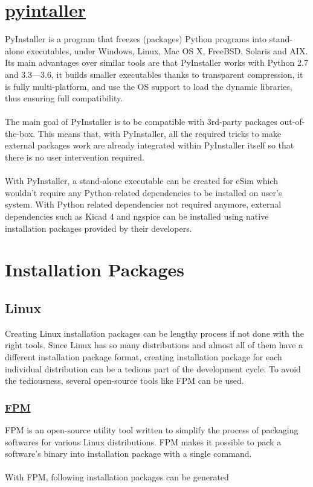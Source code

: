 \documentclass[12pt,a4paper]{report}
\begin{document}
\section{\href{http://www.pyinstaller.org/}{pyintaller}}
PyInstaller is a program that freezes (packages) Python programs into stand-alone executables, under Windows, Linux, Mac OS X, FreeBSD, Solaris and AIX. Its main advantages over similar tools are that PyInstaller works with Python 2.7 and 3.3—3.6, it builds smaller executables thanks to transparent compression, it is fully multi-platform, and use the OS support to load the dynamic libraries, thus ensuring full compatibility.\\
\\
The main goal of PyInstaller is to be compatible with 3rd-party packages out-of-the-box. This means that, with PyInstaller, all the required tricks to make external packages work are already integrated within PyInstaller itself so that there is no user intervention required.\\
\\
With PyInstaller, a stand-alone executable can be created for eSim which wouldn't require any Python-related dependencies to be installed on user's system. With Python related dependencies not required anymore, external dependencies such as Kicad 4 and ngspice can be installed using native installation packages provided by their developers.
\section{Installation Packages}
\subsection{Linux}
Creating Linux installation packages can be lengthy process if not done with the right tools. Since Linux has so many distributions and almost all of them have a different installation package format, creating installation package for each individual distribution can be a tedious part of the development cycle. To avoid the tediousness, several open-source tools like FPM can be used.
\subsubsection{\href{https://github.com/jordansissel/fpm}{FPM}}
FPM is an open-source utility tool written to simplify the process of packaging softwares for various Linux distributions. FPM makes it possible to pack a software's binary into installation package with a single command.\\
\\
With FPM, following installation packages can be generated
\end{document}
